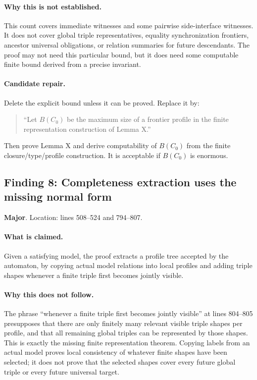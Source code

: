 \documentclass[11pt]{article}
\newcommand{\Major}{\textbf{\textcolor{maj}{Major}}}
\begin{document}
\paragraph{Why this is not established.}
This count covers immediate witnesses and some pairwise side-interface witnesses.  It does not cover global triple representatives, equality synchronization frontiers, ancestor universal obligations, or relation summaries for future descendants.  The proof may not need this particular bound, but it does need some computable finite bound derived from a precise invariant.

\paragraph{Candidate repair.}
Delete the explicit bound unless it can be proved.  Replace it by:
\begin{quote}
``Let $B(C_0)$ be the maximum size of a frontier profile in the finite representation construction of Lemma X.''
\end{quote}
Then prove Lemma X and derive computability of $B(C_0)$ from the finite closure/type/profile construction.  It is acceptable if $B(C_0)$ is enormous.

\subsection{Finding 8: Completeness extraction uses the missing normal form}

\noindent\Major.  Location: lines 508--524 and 794--807.

\paragraph{What is claimed.}
Given a satisfying model, the proof extracts a profile tree accepted by the automaton, by copying actual model relations into local profiles and adding triple shapes whenever a finite triple first becomes jointly visible.

\paragraph{Why this does not follow.}
The phrase ``whenever a finite triple first becomes jointly visible'' at lines 804--805 presupposes that there are only finitely many relevant visible triple shapes per profile, and that all remaining global triples can be represented by those shapes.  This is exactly the missing finite representation theorem.  Copying labels from an actual model proves local consistency of whatever finite shapes have been selected; it does not prove that the selected shapes cover every future global triple or every future universal target.
\end{document}
